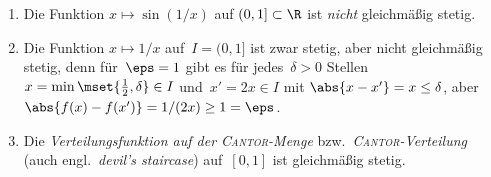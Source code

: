 \documentclass[a4paper]{article}
\begin{document}
\begin{example}\leavevmode
    \begin{enumerate}
        \item Die Funktion $x \mapsto \sin(1/x)$ auf $(0, 1] \subset \R$ ist \emph{nicht} gleichmäßig stetig.
        \begin{center}
        \end{center}
        \item Die Funktion $x \mapsto 1/x$ auf~$I = (0, 1]$ ist zwar stetig, aber nicht gleichmäßig stetig, denn für~$\eps = 1$ gibt es für jedes~$\delta > 0$ Stellen $x = \min\mset{\frac{1}{2},\delta} \in I$ und~$x' = 2x \in I$ mit $\abs{x-x'} = x \leq \delta$, aber $\abs{f(x)-f(x')} = 1/(2x) \geq 1 = \eps$.
        \item Die \emph{Verteilungsfunktion auf der \textsc{Cantor}-Menge} bzw.\ \emph{\textsc{Cantor}-Verteilung} (auch engl.\ \emph{devil's staircase}) auf~$[0, 1]$ ist gleichmäßig stetig.
        

\end{enumerate}
\end{example}
\end{document}
